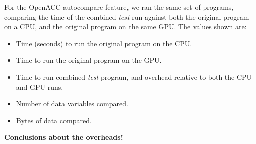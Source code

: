 For the OpenACC autocompare feature, we ran the same set of programs, comparing the time of the combined \emph{test} run against both the original program on a CPU, and the original program on the same GPU.
The values shown are:
\begin{itemize}
\item Time (seconds) to run the original program on the CPU.
\item Time to run the original program on the GPU.
\item Time to run combined \emph{test} program, and overhead relative to both the CPU and GPU runs.
\item Number of data variables compared.
\item Bytes of data compared.
\end{itemize}

\textbf{Conclusions about the overheads!}
